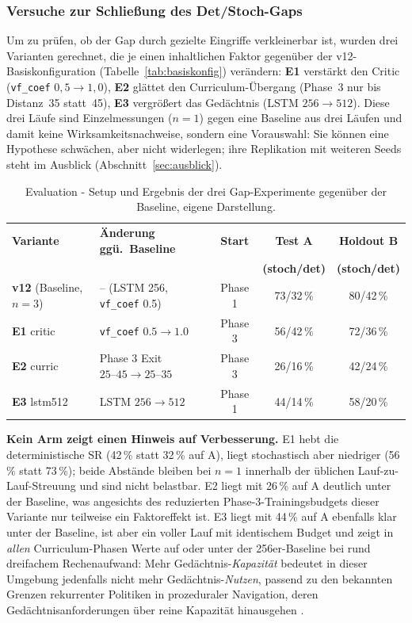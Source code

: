 \documentclass[11pt,a4paper]{article}
\begin{document}
\subsubsection{Versuche zur Schließung des Det/Stoch-Gaps}
\label{sec:gapexperimente}

Um zu prüfen, ob der Gap durch gezielte Eingriffe verkleinerbar ist, wurden drei
Varianten gerechnet, die je einen inhaltlichen Faktor gegenüber der
v12-Basiskonfiguration (Tabelle~\ref{tab:basiskonfig}) verändern:
\textbf{E1} verstärkt den Critic (\texttt{vf\_coef} $0{,}5\to1{,}0$),
\textbf{E2} glättet den Curriculum-Übergang (Phase~3 nur bis Distanz~35 statt~45),
\textbf{E3} vergrößert das Gedächtnis (LSTM $256\to512$). Diese drei Läufe
sind Einzelmessungen ($n=1$) gegen eine Baseline aus drei Läufen und damit
keine Wirksamkeitsnachweise, sondern eine Vorauswahl: Sie können eine
Hypothese schwächen, aber nicht widerlegen; ihre Replikation mit weiteren
Seeds steht im Ausblick (Abschnitt~\ref{sec:ausblick}).

\begin{table}[h]
\centering
\small
\begin{tabular}{@{}llccc@{}}
\toprule
\textbf{Variante} & \textbf{Änderung ggü.\ Baseline} & \textbf{Start} & \textbf{Test A} & \textbf{Holdout B} \\
 & & & \textbf{(stoch/det)} & \textbf{(stoch/det)} \\
\midrule
\textbf{v12} (Baseline, $n{=}3$) & -- (LSTM 256, \texttt{vf\_coef} 0.5) & Phase 1 & 73/32\,\% & 80/42\,\% \\
\textbf{E1} critic & \texttt{vf\_coef} $0.5\!\to\!1.0$ & Phase 3 & 56/42\,\% & 72/36\,\% \\
\textbf{E2} curric & Phase 3 Exit $25\text{--}45\!\to\!25\text{--}35$ & Phase 3 & 26/16\,\% & 42/24\,\% \\
\textbf{E3} lstm512 & LSTM $256\!\to\!512$ & Phase 1 & 44/14\,\% & 58/20\,\% \\
\bottomrule
\end{tabular}
\caption[Varianten zur Schließung des Det/Stoch-Gaps]{Evaluation - Setup und
Ergebnis der drei Gap-Experimente gegenüber der Baseline, eigene
Darstellung.}
\label{tab:iterationen}
\end{table}

\textbf{Kein Arm zeigt einen Hinweis auf Verbesserung.} E1 hebt die
deterministische SR (42\,\% statt 32\,\% auf A), liegt stochastisch aber
niedriger (56\,\% statt 73\,\%); beide Abstände bleiben bei $n=1$ innerhalb
der üblichen Lauf-zu-Lauf-Streuung und sind nicht belastbar. E2 liegt mit
26\,\% auf A deutlich unter der Baseline, was angesichts des reduzierten
Phase-3-Trainingsbudgets dieser Variante nur teilweise ein Faktoreffekt ist.
E3 liegt mit 44\,\% auf A ebenfalls klar unter der Baseline, ist aber ein
voller Lauf mit identischem Budget und zeigt in \emph{allen}
Curriculum-Phasen Werte auf oder unter der 256er-Baseline bei rund
dreifachem Rechenaufwand: Mehr Gedächtnis-\emph{Kapazität} bedeutet in dieser
Umgebung jedenfalls nicht mehr Gedächtnis-\emph{Nutzen}, passend zu den
bekannten Grenzen rekurrenter Politiken in prozeduraler Navigation, deren
Gedächtnisanforderungen über reine Kapazität hinausgehen
\cite{pleines2022recurrent}.
\end{document}
